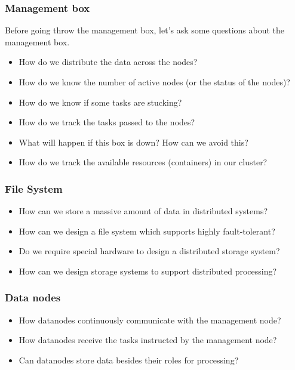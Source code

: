 \begin{frame}
	\frametitle{Management box}
	Before going throw the management box, let's ask some questions about the management box.
	\begin{itemize} [<+->]
		\item How do we distribute the data across the nodes?
		\item How do we know the number of active nodes (or the status of the nodes)?
		\item How do we know if some tasks are stucking?
		\item How do we track the tasks passed to the nodes?
		\item What will happen if this box is down? How can we avoid this?
		\item How do we track the available resources (containers) in our cluster?
	\end{itemize}
\end{frame}

\begin{frame}
	\frametitle{File System}
	\begin{itemize} [<+->]
        \item How can we store a massive amount of data in distributed systems?
        \item How can we design a file system which supports highly fault-tolerant?
        \item Do we require special hardware to design a distributed storage system?
        \item How can we design storage systems to support distributed processing?
	\end{itemize}
\end{frame}
\begin{frame}
	\frametitle{Data nodes}
	\begin{itemize} [<+->]
        \item How datanodes continuously communicate with the management node?
        \item How datanodes receive the tasks instructed by the management node?
        \item Can datanodes store data besides their roles for processing?
	\end{itemize}
\end{frame}

